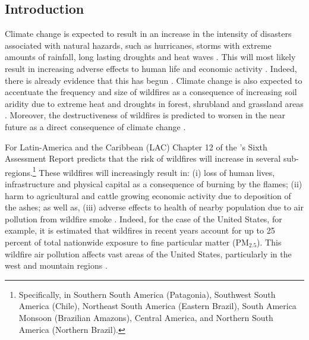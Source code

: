 \documentclass[11pt]{article}
\begin{document}
\begin{spacing}{1.5}





\section{Introduction}
Climate change is expected to result in an increase in the intensity of disasters associated with natural hazards, such as hurricanes, storms with extreme amounts of rainfall, long lasting droughts and heat waves \citep{IPCC2022climate}. This will most likely result in increasing adverse effects to human life and economic activity \citep{IPCC2022climate}. Indeed, there is already evidence that this has begun \citep{coronese2019evidence}. Climate change is also expected to accentuate the frequency and size of wildfires as a consequence of increasing soil aridity due to extreme heat and droughts in forest, shrubland and grassland areas \citep{malevsky2008assessment, gillett2004detecting, pyne2019fire}. Moreover, the destructiveness of wildfires is predicted to worsen in the near future as a direct consequence of climate change \citep{abatzoglou2016impact, bowman2017human, flannigan2009impacts, flannigan2013global}.

For Latin-America and the Caribbean (LAC) Chapter 12 of the \cite{IPCC2022climate}'s Sixth Assessment Report predicts that the risk of wildfires will increase in several sub-regions.\footnote{Specifically, in Southern South America (Patagonia), Southwest South America (Chile), Northeast South America (Eastern Brazil), South America Monsoon (Brazilian Amazons), Central America, and Northern South America (Northern Brazil).} These wildfires will increasingly result in: (i) loss of human lives, infrastructure and physical capital as a consequence of burning by the flames; (ii) harm to agricultural and cattle growing economic activity due to deposition of the ashes; as well as, (iii) adverse effects to health of nearby population due to air pollution from wildfire smoke \citep{flannigan2009impacts,bowman2017human,cancelo2018incendios}. Indeed, for the case of the United States, for example, it is estimated that wildfires in recent years account for up to 25 percent of total nationwide exposure to fine particular matter (PM$_{2.5}$). This wildfire air pollution affects vast areas of the United States, particularly in the west and mountain regions \citep{burke2021changing}. 


\end{spacing}
\end{document}
